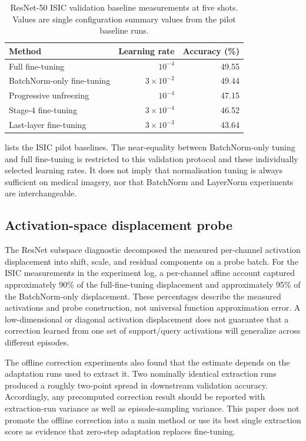 \documentclass[11pt]{article}
\begin{document}
\begin{table}[!htbp]
\centering
\small
\caption{ResNet-50 ISIC validation baseline measurements at five shots. Values are single configuration summary values from the pilot baseline runs.}
\label{tab:isicresnet}
\begin{tabular}{lrr}
\toprule
Method & Learning rate & Accuracy (\%)\\
\midrule
Full fine-tuning & $10^{-4}$ & 49.55\\
BatchNorm-only fine-tuning & $3\times10^{-2}$ & 49.44\\
Progressive unfreezing & $10^{-4}$ & 47.15\\
Stage-4 fine-tuning & $3\times10^{-4}$ & 46.52\\
Last-layer fine-tuning & $3\times10^{-3}$ & 43.64\\
\bottomrule
\end{tabular}
\end{table}

 lists the ISIC pilot baselines. The near-equality between BatchNorm-only tuning and full fine-tuning is restricted to this validation protocol and these individually selected learning rates. It does not imply that normalisation tuning is always sufficient on medical imagery, nor that BatchNorm and LayerNorm experiments are interchangeable.

\subsection{Activation-space displacement probe}

The ResNet subspace diagnostic decomposed the measured per-channel activation displacement into shift, scale, and residual components on a probe batch. For the ISIC measurements in the experiment log, a per-channel affine account captured approximately 90\% of the full-fine-tuning displacement and approximately 95\% of the BatchNorm-only displacement. These percentages describe the measured activations and probe construction, not universal function approximation error. A low-dimensional or diagonal activation displacement does not guarantee that a correction learned from one set of support/query activations will generalize across different episodes.

The offline correction experiments also found that the estimate depends on the adaptation runs used to extract it. Two nominally identical extraction runs produced a roughly two-point spread in downstream validation accuracy. Accordingly, any precomputed correction result should be reported with extraction-run variance as well as episode-sampling variance. This paper does not promote the offline correction into a main method or use its best single extraction score as evidence that zero-step adaptation replaces fine-tuning.
\end{document}
